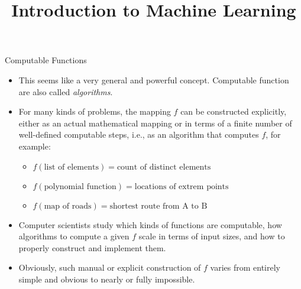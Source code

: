 




\title{Introduction to Machine Learning}
\date{}




\begin{vbframe}{Computable Functions}

\begin{itemize}
\item This seems like a very general and powerful concept. 
  Computable function are also called \emph{algorithms}.
\item For many kinds of problems, the mapping $f$ can be constructed explicitly, either as an actual mathematical mapping or in terms of a finite number of well-defined computable steps, i.e.,  as an algorithm that computes $f$, for example:
\begin{itemize}
\item $f(\textrm{list of elements}) = \textrm{count of distinct elements}$
\item $f(\textrm{polynomial function}) = \textrm{locations of extrem points}$
\item $f(\textrm{map of roads}) = \textrm{shortest route from A to B}$
\end{itemize}
\item Computer scientists study which kinds of functions are computable, how algorithms to compute a given $f$ scale in terms of input sizes, and how to properly construct and implement them.
\item Obviously, such manual or explicit construction of $f$ varies from entirely simple and obvious to nearly or fully impossible.
\end{itemize}
\end{vbframe}

\endlecture

